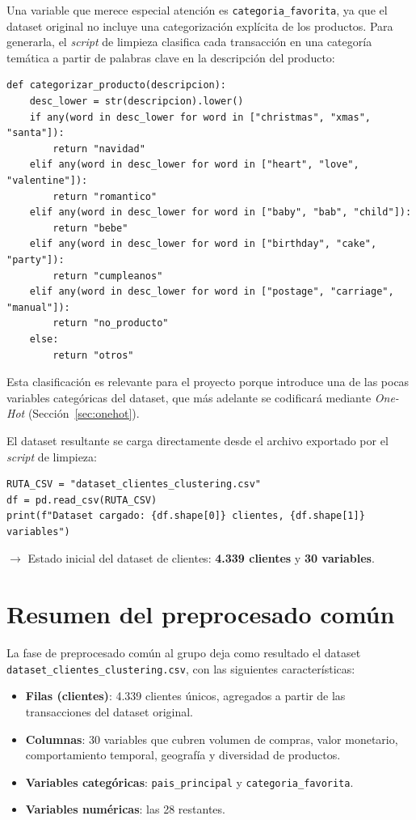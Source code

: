 \documentclass[11pt,a4paper]{article}
\begin{document}
Una variable que merece especial atención es \texttt{categoria\_favorita}, ya que el dataset original no incluye una categorización explícita de los productos. Para generarla, el \textit{script} de limpieza clasifica cada transacción en una categoría temática a partir de palabras clave en la descripción del producto:

\begin{lstlisting}
def categorizar_producto(descripcion):
    desc_lower = str(descripcion).lower()
    if any(word in desc_lower for word in ["christmas", "xmas", "santa"]):
        return "navidad"
    elif any(word in desc_lower for word in ["heart", "love", "valentine"]):
        return "romantico"
    elif any(word in desc_lower for word in ["baby", "bab", "child"]):
        return "bebe"
    elif any(word in desc_lower for word in ["birthday", "cake", "party"]):
        return "cumpleanos"
    elif any(word in desc_lower for word in ["postage", "carriage", "manual"]):
        return "no_producto"
    else:
        return "otros"
\end{lstlisting}

\noindent Esta clasificación es relevante para el proyecto porque introduce una de las pocas variables categóricas del dataset, que más adelante se codificará mediante \textit{One-Hot} (Sección~\ref{sec:onehot}).

El dataset resultante se carga directamente desde el archivo exportado por el \textit{script} de limpieza:

\begin{lstlisting}
RUTA_CSV = "dataset_clientes_clustering.csv"
df = pd.read_csv(RUTA_CSV)
print(f"Dataset cargado: {df.shape[0]} clientes, {df.shape[1]} variables")
\end{lstlisting}

\noindent$\rightarrow$ Estado inicial del dataset de clientes: \textbf{4.339 clientes} y \textbf{30 variables}.


\section{Resumen del preprocesado común}

La fase de preprocesado común al grupo deja como resultado el dataset \texttt{dataset\_clientes\_clustering.csv}, con las siguientes características:

\begin{itemize}
    \item \textbf{Filas (clientes)}: 4.339 clientes únicos, agregados a partir de las transacciones del dataset original.
    \item \textbf{Columnas}: 30 variables que cubren volumen de compras, valor monetario, comportamiento temporal, geografía y diversidad de productos.
    \item \textbf{Variables categóricas}: \texttt{pais\_principal} y \texttt{categoria\_favorita}.
    \item \textbf{Variables numéricas}: las 28 restantes.
\end{itemize}
\end{document}
